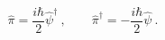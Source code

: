 \begin{equation}
\hat{\pi}={\frac{i\hbar }{2}}\hat{\psi}^{\dagger }\ ,\qquad \hat{\pi}%
^{\dagger }=-{\frac{i\hbar }{2}}\hat{\psi}\ .  \label{opmomenta}
\end{equation}%
